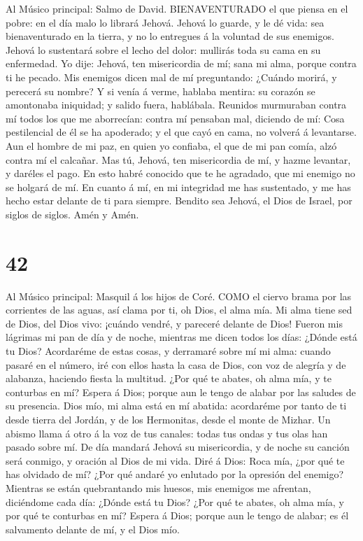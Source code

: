  Al Músico principal: Salmo de David. BIENAVENTURADO el que
piensa en el pobre: en el día malo lo librará Jehová. 
Jehová lo guarde, y le dé vida: sea bienaventurado en la tierra, y no lo
entregues á la voluntad de sus enemigos.  Jehová lo
sustentará sobre el lecho del dolor: mullirás toda su cama en su
enfermedad.  Yo dije: Jehová, ten misericordia de mí; sana
mi alma, porque contra ti he pecado.  Mis enemigos dicen mal
de mí preguntando: ¿Cuándo morirá, y perecerá su nombre?  Y
si venía á verme, hablaba mentira: su corazón se amontonaba iniquidad; y
salido fuera, hablábala.  Reunidos murmuraban contra mí
todos los que me aborrecían: contra mí pensaban mal, diciendo de mí:
 Cosa pestilencial de él se ha apoderado; y el que cayó en
cama, no volverá á levantarse.  Aun el hombre de mi paz, en
quien yo confiaba, el que de mi pan comía, alzó contra mí el calcañar.
 Mas tú, Jehová, ten misericordia de mí, y hazme levantar,
y daréles el pago.  En esto habré conocido que te he
agradado, que mi enemigo no se holgará de mí.  En cuanto á
mí, en mi integridad me has sustentado, y me has hecho estar delante de
ti para siempre.  Bendito sea Jehová, el Dios de Israel,
por siglos de siglos. Amén y Amén.

\hypertarget{section-41}{%
\section{42}\label{section-41}}

 Al Músico principal: Masquil á los hijos de Coré. COMO el
ciervo brama por las corrientes de las aguas, así clama por ti, oh Dios,
el alma mía.  Mi alma tiene sed de Dios, del Dios vivo:
¡cuándo vendré, y pareceré delante de Dios!  Fueron mis
lágrimas mi pan de día y de noche, mientras me dicen todos los días:
¿Dónde está tu Dios?  Acordaréme de estas cosas, y derramaré
sobre mí mi alma: cuando pasaré en el número, iré con ellos hasta la
casa de Dios, con voz de alegría y de alabanza, haciendo fiesta la
multitud.  ¿Por qué te abates, oh alma mía, y te conturbas
en mí? Espera á Dios; porque aun le tengo de alabar por las saludes de
su presencia.  Dios mío, mi alma está en mí abatida:
acordaréme por tanto de ti desde tierra del Jordán, y de los Hermonitas,
desde el monte de Mizhar.  Un abismo llama á otro á la voz
de tus canales: todas tus ondas y tus olas han pasado sobre mí.
 De día mandará Jehová su misericordia, y de noche su
canción será conmigo, y oración al Dios de mi vida.  Diré á
Dios: Roca mía, ¿por qué te has olvidado de mí? ¿Por qué andaré yo
enlutado por la opresión del enemigo?  Mientras se están
quebrantando mis huesos, mis enemigos me afrentan, diciéndome cada día:
¿Dónde está tu Dios?  ¿Por qué te abates, oh alma mía, y
por qué te conturbas en mí? Espera á Dios; porque aun le tengo de
alabar; es él salvamento delante de mí, y el Dios mío.

